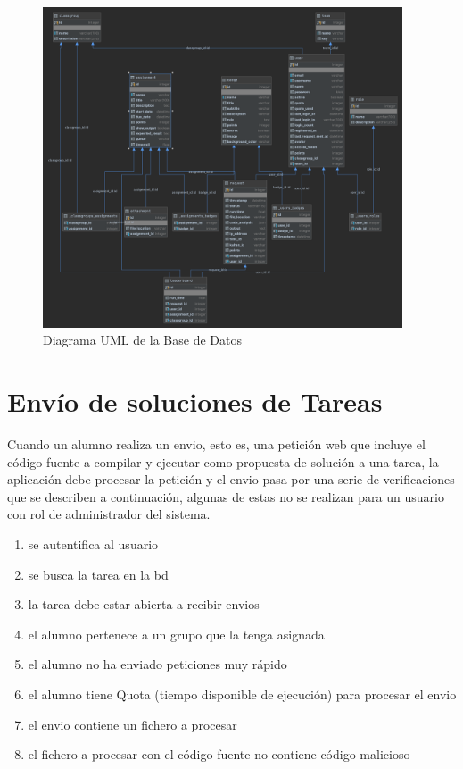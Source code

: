 \documentclass[11pt,spanish,listoffigures,listoftables]{tfgetsinf}
\begin{document}
\begin{figure}[ht]
	\centering
	\includegraphics[width=0.95\textwidth]{img/database-uml-diagram}
	\caption[Diagrama UML de la Base de Datos]{Diagrama UML de la Base de Datos}
	\label{figura:database-uml-diagram}
\end{figure}

\section{Envío de soluciones de Tareas}

Cuando un \Gls{alumno} realiza un \Gls{envio}, esto es, una petición web que incluye el código fuente a compilar y ejecutar como propuesta de solución a una \Gls{tarea}, la aplicación debe procesar la petición y el \Gls{envio} pasa por una serie de verificaciones que se describen a continuación, algunas de estas no se realizan para un usuario con rol de administrador del sistema.

\begin{enumerate}
	\item se autentifica al usuario
	\item se busca la \Gls{tarea} en la \Gls{bd}
	\item la \Gls{tarea} debe estar abierta a recibir \Gls{envio}s
	\item el \Gls{alumno} pertenece a un \Gls{grupo} que la tenga asignada
	\item el \Gls{alumno} no ha enviado peticiones muy rápido
	\item el \Gls{alumno} tiene Quota (tiempo disponible de ejecución) para procesar el \Gls{envio}
	\item el \Gls{envio} contiene un fichero a procesar
	\item el fichero a procesar con el código fuente no contiene código malicioso
\end{enumerate}
\end{document}
